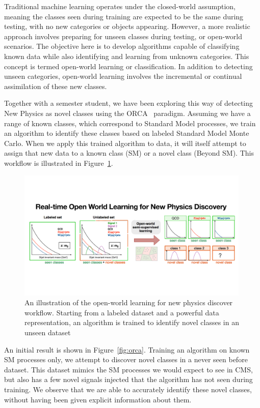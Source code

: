 \documentclass[12pt]{iopart}
\begin{document}
Traditional machine learning operates under the closed-world assumption, meaning the classes seen during training are expected to be the same during testing, with no new categories or objects appearing. However, a more realistic approach involves preparing for unseen classes during testing, or open-world scenarios. The objective here is to develop algorithms capable of classifying known data while also identifying and learning from unknown categories. This concept is termed open-world learning or classification. In addition to detecting unseen categories, open-world learning involves the incremental or continual assimilation of these new classes.

Together with a semester student, we have been exploring this way of detecting New Physics as novel classes using the ORCA~\cite{DBLP:journals/corr/abs-2102-03526} paradigm. Assuming we have a range of known classes, which correspond to Standard Model processes, we train an algorithm to identify these classes based on labeled Standard Model Monte Carlo. When we apply this trained algorithm to data, it will itself attempt to assign that new data to a known class (SM) or a novel class (Beyond SM). This workflow is illustrated in Figure~\ref{fig:ow}.
\begin{figure}[ht!]
    \centering
    \includegraphics[width=0.99\textwidth]{figures/ow_np.pdf}
    \caption{An illustration of the open-world learning for new physics discover workflow. Starting from a labeled dataset and a powerful data representation, an algorithm is trained to identify novel classes in an unseen dataset}
    \label{fig:ow}
\end{figure}

An initial result is shown in Figure~\ref{fig:orca}. Training an algorithm on known SM processes only, we attempt to discover novel classes in a never seen before dataset. This dataset mimics the SM processes we would expect to see in CMS, but also has a few novel signals injected that the algorithm has not seen during training. We observe that we are able to accurately identify these novel classes, without having been given explicit information about them.
\end{document}
